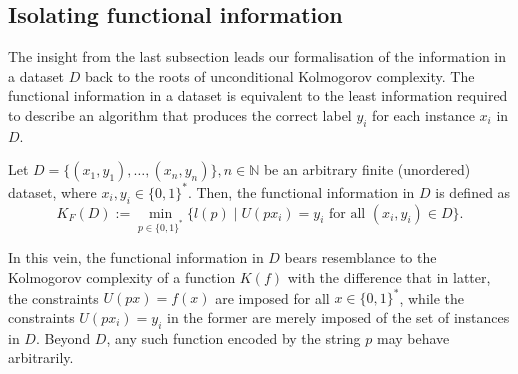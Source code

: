 \subsection{Isolating functional information}
The insight from the last subsection leads our formalisation of the information in a dataset $D$ back to the roots of unconditional Kolmogorov complexity.
The functional information in a dataset is equivalent to the least information required to describe an algorithm that produces the correct label $y_i$ for each instance $x_i$ in $D$.
\begin{definition}
	\label{def:functional-information}
	Let $D=\{(x_1,y_1),\dots,(x_n,y_n)\},n\in\mathbb{N}$ be an arbitrary finite (unordered) dataset, where $x_i,y_i\in\{0,1\}^{*}$.
	Then, the functional information in $D$ is defined as
	\begin{equation}
		K_{F}(D):=\min_{p\in\{0,1\}^{*}}\{l(p)\mid U(px_i)=y_i \text{ for all } (x_i,y_i)\in D\}.
	\end{equation}
\end{definition}
In this vein, the functional information in $D$ bears resemblance to the Kolmogorov complexity of a function $K(f)$ with the difference that in latter, the constraints $U(px)=f(x)$ are imposed for all $x\in\{0,1\}^{*}$, while the constraints $U(px_i)=y_i$ in the former are merely imposed of the set of instances in $D$. Beyond $D$, any such function encoded by the string $p$ may behave arbitrarily.

